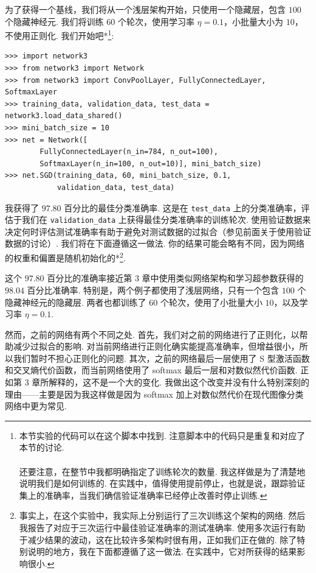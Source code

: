 为了获得一个基线，我们将从一个浅层架构开始，只使用一个隐藏层，包含 $100$ 个隐藏神经元. 我们将训练 $60$ 个轮次，使用学习率 $\eta = 0.1$，小批量大小为 $10$，不使用正则化. 我们开始吧*\footnote{本节实验的代码可以在这个脚本中找到. 注意脚本中的代码只是重复和对应了本节的讨论.\\ \\ 还要注意，在整节中我都明确指定了训练轮次的数量. 我这样做是为了清楚地说明我们是如何训练的. 在实践中，值得使用提前停止，也就是说，跟踪验证集\label{term:77}上的准确率，当我们确信验证准确率已经停止改善时停止训练.}:

\begin{lstlisting}
>>> import network3
>>> from network3 import Network
>>> from network3 import ConvPoolLayer, FullyConnectedLayer, SoftmaxLayer
>>> training_data, validation_data, test_data = network3.load_data_shared()
>>> mini_batch_size = 10
>>> net = Network([
        FullyConnectedLayer(n_in=784, n_out=100),
        SoftmaxLayer(n_in=100, n_out=10)], mini_batch_size)
>>> net.SGD(training_data, 60, mini_batch_size, 0.1,
            validation_data, test_data)

\end{lstlisting}

我获得了 $97.80$ 百分比的最佳分类准确率. 这是在 \texttt{test\_\allowbreak{}data} 上的分类准确率，评估于我们在 \texttt{validation\_\allowbreak{}data} 上获得最佳分类准确率的训练轮次. 使用验证数据来决定何时评估测试准确率有助于避免对测试数据的过拟合（参见前面关于使用验证数据的讨论）. 我们将在下面遵循这一做法. 你的结果可能会略有不同，因为网络的权重和偏置是随机初始化的*\footnote{事实上，在这个实验中，我实际上分别运行了三次训练这个架构的网络. 然后我报告了对应于三次运行中最佳验证准确率的测试准确率. 使用多次运行有助于减少结果的波动，这在比较许多架构时很有用，正如我们正在做的. 除了特别说明的地方，我在下面都遵循了这一做法. 在实践中，它对所获得的结果影响很小.}.

这个 $97.80$ 百分比的准确率接近第 3 章中使用类似网络架构和学习超参数获得的 $98.04$ 百分比准确率. 特别是，两个例子都使用了浅层网络，只有一个包含 $100$ 个隐藏神经元的隐藏层. 两者也都训练了 $60$ 个轮次，使用了小批量大小 $10$，以及学习率 $\eta = 0.1$.

然而，之前的网络有两个不同之处. 首先，我们对之前的网络进行了正则化，以帮助减少过拟合的影响. 对当前网络进行正则化确实能提高准确率，但增益很小，所以我们暂时不担心正则化的问题. 其次，之前的网络最后一层使用了 S 型激活函数和交叉熵代价函数，而当前网络使用了 softmax 最后一层和对数似然代价函数. 正如第 3 章所解释的，这不是一个大的变化. 我做出这个改变并没有什么特别深刻的理由——主要是因为我这样做是因为 softmax 加上对数似然代价在现代图像分类网络中更为常见.

